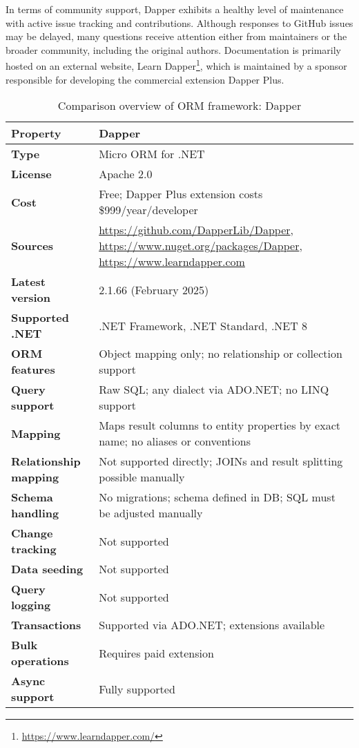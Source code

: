 In terms of community support, Dapper exhibits a healthy level of maintenance with active issue tracking and contributions. Although responses to GitHub issues may be delayed, many questions receive attention either from maintainers or the broader community, including the original authors. Documentation is primarily hosted on an external website, Learn Dapper\footnote{\url{https://www.learndapper.com/}}, which is maintained by a sponsor responsible for developing the commercial extension Dapper Plus.

\begin{table}[H]
\centering
\caption{Comparison overview of ORM framework: Dapper}
\begin{tabular}{|l|l|}
\toprule
\textbf{Property} & \textbf{Dapper} \\
\midrule
\textbf{Type} & Micro ORM for .NET \\
\textbf{License} & Apache 2.0 \\
\textbf{Cost} & Free; Dapper Plus extension costs \$999/year/developer \\
\textbf{Sources} & \url{https://github.com/DapperLib/Dapper}, \url{https://www.nuget.org/packages/Dapper}, \url{https://www.learndapper.com} \\
\textbf{Latest version} & 2.1.66 (February 2025) \\
\textbf{Supported .NET} & .NET Framework, .NET Standard, .NET 8 \\
\textbf{ORM features} & Object mapping only; no relationship or collection support \\
\textbf{Query support} & Raw SQL; any dialect via ADO.NET; no LINQ support \\
\textbf{Mapping} & Maps result columns to entity properties by exact name; no aliases or conventions \\
\textbf{Relationship mapping} & Not supported directly; JOINs and result splitting possible manually \\
\textbf{Schema handling} & No migrations; schema defined in DB; SQL must be adjusted manually \\
\textbf{Change tracking} & Not supported \\
\textbf{Data seeding} & Not supported \\
\textbf{Query logging} & Not supported \\
\textbf{Transactions} & Supported via ADO.NET; extensions available \\
\textbf{Bulk operations} & Requires paid extension \\
\textbf{Async support} & Fully supported \\

\end{tabular}
\end{table}
